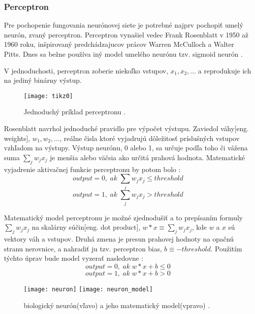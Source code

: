 \subsubsection{Perceptron}
Pre pochopenie fungovania neurónovej siete je potrebné najprv pochopiť umelý neurón, zvaný perceptron.
Perceptron vynašiel vedec Frank Rosenblatt v 1950 až 1960 roku, inšpirovaný predchádzajucov prácov Warren McCulloch a Walter Pitts.
Dnes sa bežne používa iný model umelého neurónu tzv. sigmoid neurón \cite{odkaz:HandwrittenDigitRecognision}.

V jednoduchosti, perceptron zoberie niekoľko vstupov, $x_1, x_2, \dots$ a reprodukuje ich na jediný binárny výstup.
\begin{figure}[H]
	\centering
	\texttt{[image: tikz0]}
	\caption{Jednoduchý príklad perceptronu \cite{odkaz:HandwrittenDigitRecognision}.}
	\label{pic:Perceptron}
\end{figure}
Rosenblatt navrhol jednoduché pravidlo pre výpočet výstupu.
Zaviedol váhy[eng. weights], $w_1, w_2, \dots$,
    reálne čisla ktoré vyjadrujú dôležitosť príslušných vstupov vzhľadom na výstupy.
Výstup neurónu, 0 alebo 1, sa určuje podľa toho či vážena suma $\sum_j w_j x_j$ je menšia alebo väčsia ako určitá prahová hodnota.
Matematické vyjadrenie aktivačnej funkcie perceptronu by potom bolo \cite{odkaz:HandwrittenDigitRecognision}:
\begin{equation}
    output = 0, \; ak \; \sum_j w_j x_j \leq threshold
\end{equation}
\begin{equation}
    output = 1, \; ak \; \sum_j w_j x_j > threshold
\end{equation}

Matematický model perceptronu je možné zjednodušiť a to prepísaním formuly $\sum_j w_j x_j$ na skalárny súčin[eng. dot product],
    $w*x \equiv \sum_j w_j x_j$, kde $w$ a $x$ sú vektory váh a vstupov.
Druhá zmena je presun prahovej hodnoty na opačnú stranu nerovnice, a nahradiť ju tzv. perceptron bias, $b \equiv -threshold$.
Použitím týchto úprav bude model vyzerať nasledovne \cite{odkaz:HandwrittenDigitRecognision}:
\begin{equation}
    output = 0, \; ak \; w*x + b \leq 0
\end{equation}
\begin{equation}
    output = 1, \; ak \; w*x + b > 0
\end{equation}

\begin{figure}[H]
    \centering
    \texttt{[image: neuron]}
    \qquad
    \texttt{[image: neuron\_model]}
    \caption{biologický neurón(vľavo) a jeho matematický model(vpravo) \cite{odkaz:ConvolutionalNeuralNetworkCS231n}.}
    \label{pic:Neuron}
\end{figure}

